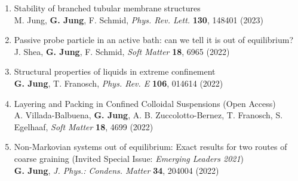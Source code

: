 \begin{enumerate}
	\item  Stability of branched tubular membrane structures\\
	M. Jung, \textbf{G. Jung}, F. Schmid, \emph{Phys. Rev. Lett.} \textbf{130}, 148401 (2023)
	
	\item  Passive probe particle in an active bath: can we tell it is out of equilibrium?\\
	J. Shea, \textbf{G. Jung}, F. Schmid, \emph{Soft Matter} \textbf{18}, 6965 (2022)
	
	\item  Structural properties of liquids in extreme confinement\\
	\textbf{G. Jung}, T. Franosch, \emph{Phys. Rev. E} \textbf{106}, 014614 (2022) 
	
	\item  Layering and Packing in Confined Colloidal Suspensions (Open Access)\\
	A. Villada-Balbuena, \textbf{G. Jung}, A. B. Zuccolotto-Bernez, T. Franosch, S. Egelhaaf, \emph{Soft Matter} \textbf{18}, 4699 (2022)
	
	\item  Non-Markovian systems out of equilibrium: Exact results for two routes of coarse graining (Invited Special Issue: \emph{Emerging Leaders 2021})\\
	\textbf{G. Jung}, \emph{J. Phys.: Condens. Matter} \textbf{34}, 204004 (2022)
	

\end{enumerate}
